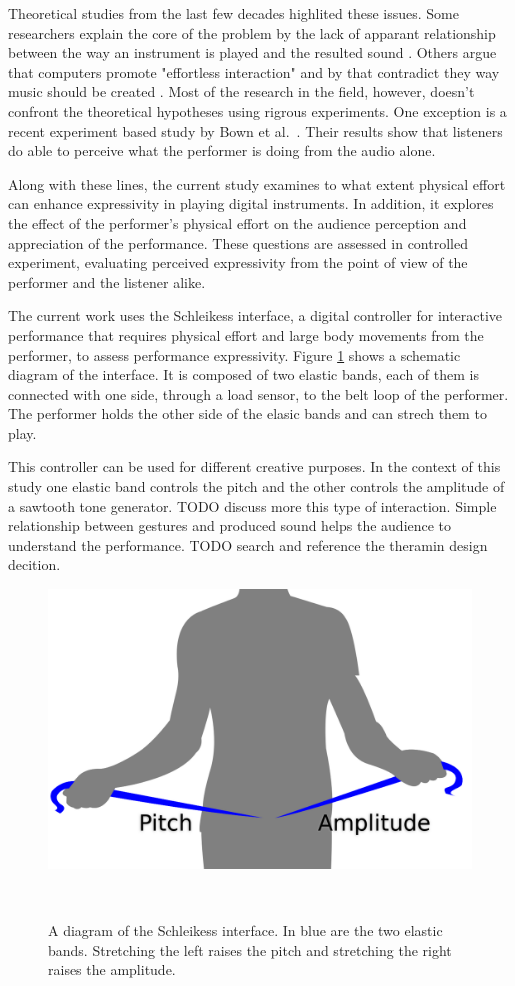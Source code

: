 \documentclass{sigchi}
\begin{document}
Theoretical studies from the last few decades highlited these issues.
Some researchers explain the core of the problem by the lack of apparant relationship between the way an instrument is played and the resulted sound \cite{Schloss2003,DEscrivan2006}.
Others argue that computers promote "effortless interaction" and by that contradict they way music should be created \cite{Ryan1992}.
Most of the research in the field, however, doesn't confront the theoretical hypotheses using rigrous experiments.
One exception is a recent experiment based study by Bown et al.\ \cite{Bown2014}.
Their results show that listeners do able to perceive what the performer is doing from the audio alone.

Along with these lines, the current study examines to what extent physical effort can enhance expressivity in playing digital instruments.
In addition, it explores the effect of the performer's physical effort on the audience perception and appreciation of the performance.
These questions are assessed in controlled experiment, evaluating perceived expressivity from the point of view of the performer and the listener alike.

The current work uses the Schleikess interface, a digital controller for interactive performance that requires physical effort and large body movements from the performer, to assess performance expressivity.
Figure \ref{fig:schleikess} shows a schematic diagram of the interface.
It is composed of two elastic bands, each of them is connected with one side, through a load sensor, to the belt loop of the performer.
The performer holds the other side of the elasic bands and can strech them to play.

This controller can be used for different creative purposes.
In the context of this study one elastic band controls the pitch and the other controls the amplitude of a sawtooth tone generator.
TODO discuss more this type of interaction. Simple relationship between gestures and produced sound helps the audience to understand the performance. TODO search and reference the theramin design decition.

\begin{figure}
  \centering
  \includegraphics[width=0.9\columnwidth]{figures/schleikess}
  \caption{A diagram of the Schleikess interface. In blue are the two elastic bands. Stretching the left raises the pitch and stretching the right raises the amplitude.}~\label{fig:schleikess}
\end{figure}
\end{document}
